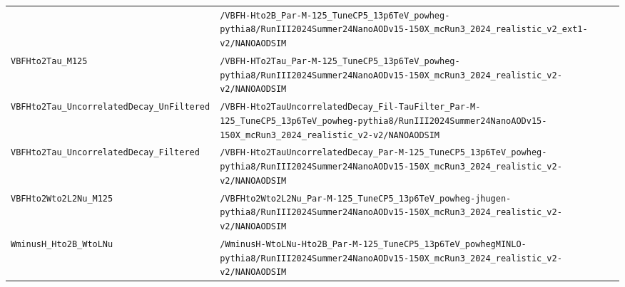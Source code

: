 \begin{longtable}{@{}>{\RaggedRight\arraybackslash}p{} >{\RaggedRight\arraybackslash}p{}@{}}
 & \texttt{/\allowbreak{}VBFH-\allowbreak{}Hto2B\_\allowbreak{}Par-\allowbreak{}M-\allowbreak{}125\_\allowbreak{}TuneCP5\_\allowbreak{}13p6TeV\_\allowbreak{}powheg-\allowbreak{}pythia8/\allowbreak{}RunIII2024Summer24NanoAODv15-\allowbreak{}150X\_\allowbreak{}mcRun3\_\allowbreak{}2024\_\allowbreak{}realistic\_\allowbreak{}v2\_\allowbreak{}ext1-\allowbreak{}v2/\allowbreak{}NANOAODSIM} \\
\addlinespace[2pt]
\texttt{VBFHto2Tau\_\allowbreak{}M125} & \texttt{/\allowbreak{}VBFH-\allowbreak{}HTo2Tau\_\allowbreak{}Par-\allowbreak{}M-\allowbreak{}125\_\allowbreak{}TuneCP5\_\allowbreak{}13p6TeV\_\allowbreak{}powheg-\allowbreak{}pythia8/\allowbreak{}RunIII2024Summer24NanoAODv15-\allowbreak{}150X\_\allowbreak{}mcRun3\_\allowbreak{}2024\_\allowbreak{}realistic\_\allowbreak{}v2-\allowbreak{}v2/\allowbreak{}NANOAODSIM} \\
\addlinespace[2pt]
\texttt{VBFHto2Tau\_\allowbreak{}UncorrelatedDecay\_\allowbreak{}UnFiltered} & \texttt{/\allowbreak{}VBFH-\allowbreak{}Hto2TauUncorrelatedDecay\_\allowbreak{}Fil-\allowbreak{}TauFilter\_\allowbreak{}Par-\allowbreak{}M-\allowbreak{}125\_\allowbreak{}TuneCP5\_\allowbreak{}13p6TeV\_\allowbreak{}powheg-\allowbreak{}pythia8/\allowbreak{}RunIII2024Summer24NanoAODv15-\allowbreak{}150X\_\allowbreak{}mcRun3\_\allowbreak{}2024\_\allowbreak{}realistic\_\allowbreak{}v2-\allowbreak{}v2/\allowbreak{}NANOAODSIM} \\
\addlinespace[2pt]
\texttt{VBFHto2Tau\_\allowbreak{}UncorrelatedDecay\_\allowbreak{}Filtered} & \texttt{/\allowbreak{}VBFH-\allowbreak{}Hto2TauUncorrelatedDecay\_\allowbreak{}Par-\allowbreak{}M-\allowbreak{}125\_\allowbreak{}TuneCP5\_\allowbreak{}13p6TeV\_\allowbreak{}powheg-\allowbreak{}pythia8/\allowbreak{}RunIII2024Summer24NanoAODv15-\allowbreak{}150X\_\allowbreak{}mcRun3\_\allowbreak{}2024\_\allowbreak{}realistic\_\allowbreak{}v2-\allowbreak{}v2/\allowbreak{}NANOAODSIM} \\
\addlinespace[2pt]
\texttt{VBFHto2Wto2L2Nu\_\allowbreak{}M125} & \texttt{/\allowbreak{}VBFHto2Wto2L2Nu\_\allowbreak{}Par-\allowbreak{}M-\allowbreak{}125\_\allowbreak{}TuneCP5\_\allowbreak{}13p6TeV\_\allowbreak{}powheg-\allowbreak{}jhugen-\allowbreak{}pythia8/\allowbreak{}RunIII2024Summer24NanoAODv15-\allowbreak{}150X\_\allowbreak{}mcRun3\_\allowbreak{}2024\_\allowbreak{}realistic\_\allowbreak{}v2-\allowbreak{}v2/\allowbreak{}NANOAODSIM} \\
\addlinespace[2pt]
\texttt{WminusH\_\allowbreak{}Hto2B\_\allowbreak{}WtoLNu} & \texttt{/\allowbreak{}WminusH-\allowbreak{}WtoLNu-\allowbreak{}Hto2B\_\allowbreak{}Par-\allowbreak{}M-\allowbreak{}125\_\allowbreak{}TuneCP5\_\allowbreak{}13p6TeV\_\allowbreak{}powhegMINLO-\allowbreak{}pythia8/\allowbreak{}RunIII2024Summer24NanoAODv15-\allowbreak{}150X\_\allowbreak{}mcRun3\_\allowbreak{}2024\_\allowbreak{}realistic\_\allowbreak{}v2-\allowbreak{}v2/\allowbreak{}NANOAODSIM} \\

\end{longtable}
